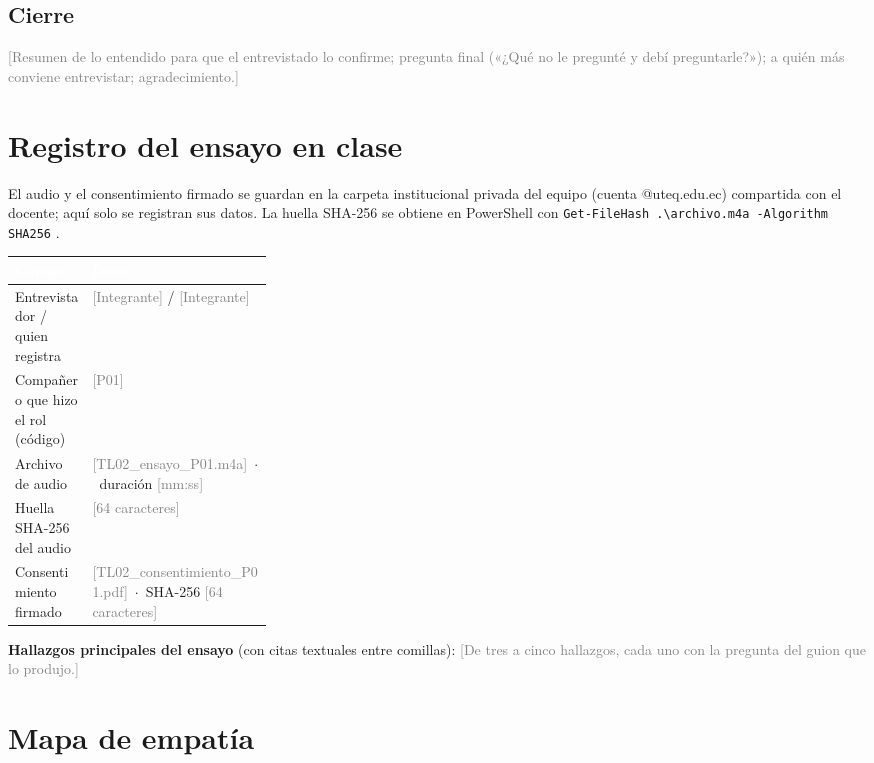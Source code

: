 \documentclass[11pt,a4paper]{article}
\newcommand{\thdr}[1]{\cellcolor{utegreen}\textcolor{white}{\textbf{#1}}}
\newcommand{\pendiente}[1]{\textcolor{gray}{[#1]}}
\begin{document}
\subsection{Cierre}

\pendiente{Resumen de lo entendido para que el entrevistado lo confirme; pregunta final («¿Qué no le pregunté y debí preguntarle?»); a quién más conviene entrevistar; agradecimiento.}

\section{Registro del ensayo en clase}

El audio y el consentimiento firmado se guardan en la carpeta institucional privada del equipo (cuenta @uteq.edu.ec) compartida con el docente; aquí solo se registran sus datos. La huella SHA-256 se obtiene en PowerShell con \texttt{Get-FileHash .\textbackslash archivo.m4a -Algorithm SHA256} \cite{lopdp_2021}.

\begin{tabularx}{\linewidth}{|L{0.30\linewidth}|Y|}
	\hline
	\thdr{Campo} & \thdr{Dato}\\
	\hline
	Entrevistador / quien registra & \pendiente{Integrante} / \pendiente{Integrante}\\
	\hline
	Compañero que hizo el rol (código) & \pendiente{P01}\\
	\hline
	Archivo de audio & \pendiente{TL02\_ensayo\_P01.m4a} \,$\cdot$\, duración \pendiente{mm:ss}\\
	\hline
	Huella SHA-256 del audio & \pendiente{64 caracteres}\\
	\hline
	Consentimiento firmado & \pendiente{TL02\_consentimiento\_P01.pdf} \,$\cdot$\, SHA-256 \pendiente{64 caracteres}\\
	\hline
\end{tabularx}

\textbf{Hallazgos principales del ensayo} (con citas textuales entre comillas): \pendiente{De tres a cinco hallazgos, cada uno con la pregunta del guion que lo produjo.}

\section{Mapa de empatía}
\end{document}
